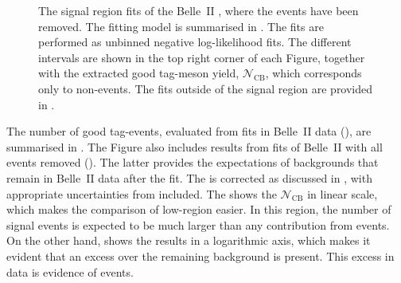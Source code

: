 \begin{figure}[hbtp!]
{    }
    \caption{\label{fig:nosignal_fits_signal}
    The \EB signal region fits of the Belle~II \MC, where the \BtoXsdgamma events have been removed.
    The fitting model is summarised in .
    The fits are performed as unbinned negative log-likelihood fits.
    The different \EB intervals are shown in the top right corner of each Figure, 
    together with the extracted good tag-\B meson yield, $\mathcal{N}_{\mathrm{CB}}$, which corresponds only to non-\BtoXsdgamma events.
    The fits outside of the signal region are provided in .
    }
\end{figure}

The number of good tag-\B events, evaluated from fits in Belle~II data (),
are summarised in .
The Figure also includes results from fits of Belle~II \MC with all \BtoXsgamma events removed ().
The latter provides the expectations of \BB backgrounds that remain in Belle~II data after the fit.
The \MC is corrected as discussed in , with appropriate uncertainties from  included.
The  shows the $\mathcal{N}_{\mathrm{CB}}$ in linear scale, which makes the comparison of low-\EB region easier. 
In this region, the number of signal events is expected to be much larger than any contribution from \BtoXsgamma events.
On the other hand,  shows the results in a logarithmic axis, which makes it evident that an excess over the remaining \BB background is present.
This excess in data is evidence of \BtoXsdgamma events.

